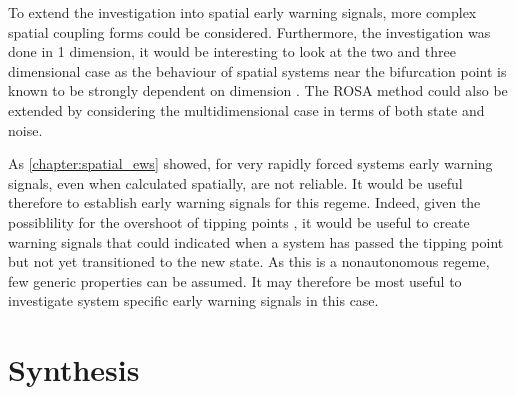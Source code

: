 To extend the investigation into spatial early warning signals, more complex spatial coupling forms could be considered. Furthermore, the investigation was done in 1 dimension, it
would be interesting to look at the two and three dimensional case as the behaviour of spatial systems near the bifurcation point is known to be strongly dependent
on dimension \parencite{Goldenfeld1992}. The ROSA method could also be extended by considering the multidimensional case in terms of both state and noise.

As \cref{chapter:spatial_ews} showed, for very rapidly forced systems early warning signals, even when calculated spatially, are not reliable. It would be useful therefore to
establish early warning signals for this regeme. Indeed, given the possiblility for the overshoot of tipping points \parencite{Ritchie2021}, it would be useful to create warning signals that could
indicated when a system has passed the tipping point but not yet transitioned to the new state. As this is a nonautonomous regeme, few generic properties can be assumed. It may therefore be
most useful to investigate system specific early warning signals in this case.

\section{Synthesis}
